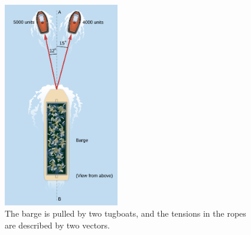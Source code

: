 \documentclass{article}
\begin{document}
\begin{figure}[ht]
\centering
\includegraphics[width=0.45\textwidth]{figures/boat.jpeg}
\caption{\label{fig:1} The barge is pulled by two tugboats, and the tensions in the ropes are described by two vectors.}
\end{figure}
\end{document}
